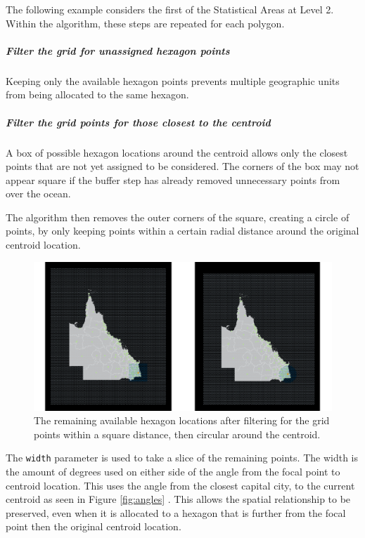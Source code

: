 The following example considers the first of the Statistical Areas at
Level 2. Within the algorithm, these steps are repeated for each
polygon.

\hypertarget{filter-the-grid-for-unassigned-hexagon-points}{%
\subparagraph{Filter the grid for unassigned hexagon
points}\label{filter-the-grid-for-unassigned-hexagon-points}}

Keeping only the available hexagon points prevents multiple geographic
units from being allocated to the same hexagon.

\hypertarget{filter-the-grid-points-for-those-closest-to-the-centroid}{%
\subparagraph{Filter the grid points for those closest to the
centroid}\label{filter-the-grid-points-for-those-closest-to-the-centroid}}

A box of possible hexagon locations around the centroid allows only the
closest points that are not yet assigned to be considered. The corners
of the box may not appear square if the buffer step has already removed
unnecessary points from over the ocean.

The algorithm then removes the outer corners of the square, creating a
circle of points, by only keeping points within a certain radial
distance around the original centroid location.

\begin{figure}[h]
\centering
\includegraphics[width=16cm]{figs/4grid.png}
\caption{\label{fig:buffers}The remaining available hexagon locations after filtering for the grid points within a square distance, then circular around the centroid.}
\end{figure}

The \texttt{width} parameter is used to take a slice of the remaining
points. The width is the amount of degrees used on either side of the
angle from the focal point to centroid location. This uses the angle
from the closest capital city, to the current centroid as seen in Figure
\ref{fig:angles} . This allows the spatial relationship to be preserved,
even when it is allocated to a hexagon that is further from the focal
point then the original centroid location.

